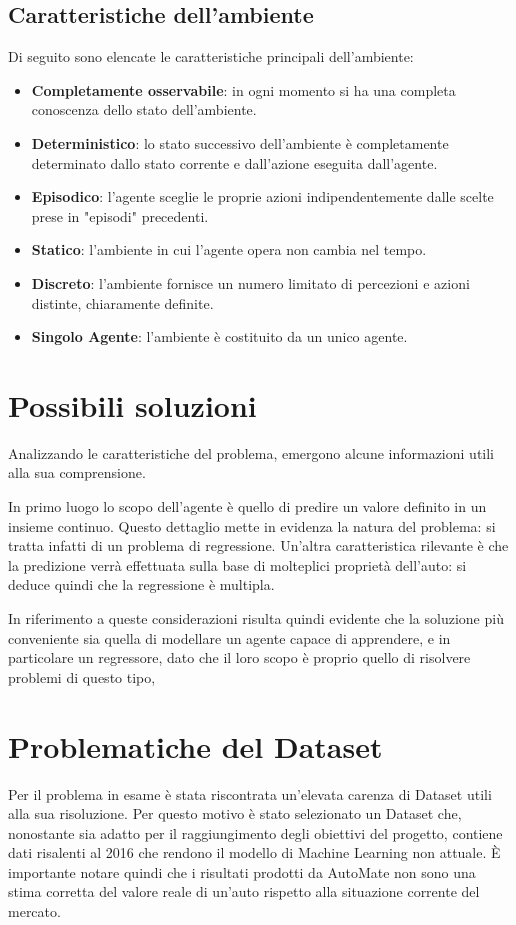 \subsection{Caratteristiche dell'ambiente}
Di seguito sono elencate le caratteristiche principali dell'ambiente:
\begin{itemize}
    \item \textbf{Completamente osservabile}: in ogni momento si ha una completa conoscenza dello stato dell'ambiente.
    \item \textbf{Deterministico}: lo stato successivo dell’ambiente è completamente determinato dallo stato corrente e dall’azione eseguita dall’agente.
    \item \textbf{Episodico}: l'agente sceglie le proprie azioni indipendentemente dalle scelte prese in "episodi" precedenti.
    \item \textbf{Statico}: l'ambiente in cui l'agente opera non cambia nel tempo.
    \item \textbf{Discreto}: l'ambiente fornisce un numero limitato di percezioni e azioni distinte, chiaramente definite.
    \item \textbf{Singolo Agente}: l'ambiente è costituito da un unico agente.
\end{itemize}

\medskip
\section{Possibili soluzioni}
Analizzando le caratteristiche del problema, emergono alcune informazioni utili alla sua comprensione.

In primo luogo lo scopo dell'agente è quello di predire un valore definito in un insieme continuo. Questo dettaglio mette in evidenza la natura del problema: si tratta infatti di un problema di regressione.
Un'altra caratteristica rilevante è che la predizione verrà effettuata sulla base di molteplici proprietà dell'auto: si deduce quindi che la regressione è multipla.

In riferimento a queste considerazioni risulta quindi evidente che la soluzione più conveniente sia quella di modellare un agente capace di apprendere, e in particolare un regressore, dato che il loro scopo è proprio quello di risolvere problemi di questo tipo,

\medskip
\label{sec:problematicheDataset}
\section{Problematiche del Dataset}
Per il problema in esame è stata riscontrata un'elevata carenza di Dataset utili alla sua risoluzione. Per questo motivo è stato selezionato un Dataset che, nonostante sia adatto per il raggiungimento degli obiettivi del progetto, contiene dati risalenti al 2016 che rendono il modello di Machine Learning non attuale. È importante notare quindi che i risultati prodotti da AutoMate non sono una stima corretta del valore reale di un'auto rispetto alla situazione corrente del mercato.